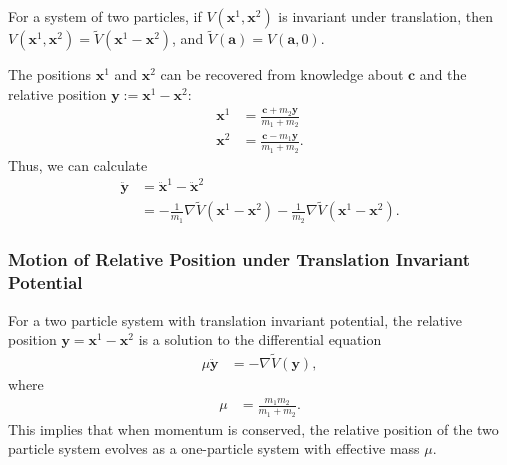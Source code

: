 \documentclass[12pt]{extarticle}
\theoremstyle{plain}
\theoremstyle{definition}
\theoremstyle{remark}
\renewcommand{\newline}{\hfill\break}
\begin{document}
  For a system of two particles, if $V( \mathbf{x}^1, \mathbf{x}^2 )$ is invariant under translation, then $V( \mathbf{x}^1, \mathbf{x}^2 ) = \tilde{V}( \mathbf{x}^1- \mathbf{x}^2 )$, and $\tilde{V}(\mathbf{a}) = V\left(\mathbf{a},0\right)$.\newline

  The positions $\mathbf{x}^1$ and $\mathbf{x}^2$ can be recovered from knowledge about $\mathbf{c}$ and the relative position $\mathbf{y} := \mathbf{x}^1 - \mathbf{x}^2$:
  \begin{align*}
    \mathbf{x}^1 &= \frac{\mathbf{c} + m_2\mathbf{y}}{m_1 + m_2}\\
    \mathbf{x}^2 &= \frac{\mathbf{c} - m_1\mathbf{y}}{m_1 + m_2}.
  \end{align*}
  Thus, we can calculate
  \begin{align*}
    \mathbf{\ddot{y}} &= \mathbf{\ddot{x}}^1 - \mathbf{\ddot{x}}^2\\
                      &= -\frac{1}{m_1}\nabla\tilde{V}\left(\mathbf{x}^1 - \mathbf{x}^2\right) - \frac{1}{m_2}\nabla\tilde{V}\left(\mathbf{x}^1 - \mathbf{x}^2\right).
  \end{align*}
  \subsubsection{Motion of Relative Position under Translation Invariant Potential}%
  For a two particle system with translation invariant potential, the relative position $\mathbf{y} = \mathbf{x}^1 - \mathbf{x}^2$ is a solution to the differential equation
  \begin{align*}
    \mu\mathbf{\ddot{y}} &= -\nabla\tilde{V}(\mathbf{y}),
  \end{align*}
  where
  \begin{align*}
    \mu &= \frac{m_1m_2}{m_1 + m_2}.
  \end{align*}
  This implies that when momentum is conserved, the relative position of the two particle system evolves as a one-particle system with effective mass $\mu$.
\end{document}
